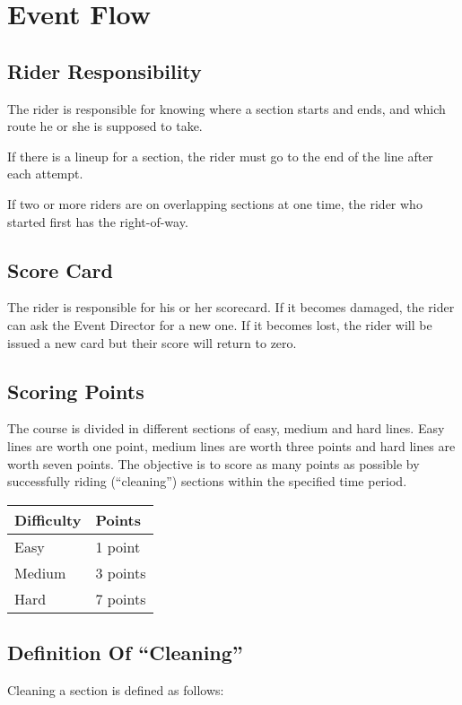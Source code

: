 \section{Event Flow}

\subsection{Rider Responsibility}

The rider is responsible for knowing where a section starts and ends, and which route he or she is supposed to take.

If there is a lineup for a section, the rider must go to the end of the line after each attempt.

If two or more riders are on overlapping sections at one time, the rider who started first has the right-of-way.


\subsection{Score Card}
The rider is responsible for his or her scorecard.
If it becomes damaged, the rider can ask the Event Director for a new one.
If it becomes lost, the rider will be issued a new card but their score will return to zero.

\subsection{Scoring Points}
The course is divided in different sections of easy, medium and hard lines.
Easy lines are worth one point, medium lines are worth three points and hard lines are worth seven points.
The objective is to score as many points as possible by successfully riding (``cleaning'') sections within the specified time period.

\begin{tabular}{|l|l|}
\hline
\textbf{Difficulty} & \textbf{Points}\\
\hline
Easy & 1 point\\
\hline
Medium & 3 points\\
\hline
Hard & 7 points\\
\hline
\end{tabular}

\subsection{Definition Of ``Cleaning''}
Cleaning a section is defined as follows:

